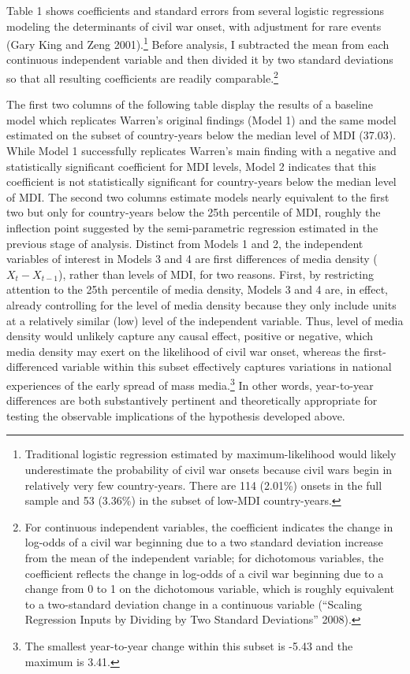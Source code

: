 \documentclass[11pt,article,oneside]{memoir}
\begin{document}
Table 1 shows coefficients and standard errors from several logistic
regressions modeling the determinants of civil war onset, with
adjustment for rare events (Gary King and Zeng 2001).\footnote{Traditional
  logistic regression estimated by maximum-likelihood would likely
  underestimate the probability of civil war onsets because civil wars
  begin in relatively very few country-years. There are 114 (2.01\%)
  onsets in the full sample and 53 (3.36\%) in the subset of low-MDI
  country-years.} Before analysis, I subtracted the mean from each
continuous independent variable and then divided it by two standard
deviations so that all resulting coefficients are readily
comparable.\footnote{For continuous independent variables, the
  coefficient indicates the change in log-odds of a civil war beginning
  due to a two standard deviation increase from the mean of the
  independent variable; for dichotomous variables, the coefficient
  reflects the change in log-odds of a civil war beginning due to a
  change from 0 to 1 on the dichotomous variable, which is roughly
  equivalent to a two-standard deviation change in a continuous variable
  (``Scaling Regression Inputs by Dividing by Two Standard Deviations''
  2008).}

The first two columns of the following table display the results of a
baseline model which replicates Warren's original findings (Model 1) and
the same model estimated on the subset of country-years below the median
level of MDI (37.03). While Model 1 successfully replicates Warren's
main finding with a negative and statistically significant coefficient
for MDI levels, Model 2 indicates that this coefficient is not
statistically significant for country-years below the median level of
MDI. The second two columns estimate models nearly equivalent to the
first two but only for country-years below the 25th percentile of MDI,
roughly the inflection point suggested by the semi-parametric regression
estimated in the previous stage of analysis. Distinct from Models 1 and
2, the independent variables of interest in Models 3 and 4 are first
differences of media density ($X_{t} - X_{t-1}$), rather than levels of
MDI, for two reasons. First, by restricting attention to the 25th
percentile of media density, Models 3 and 4 are, in effect, already
controlling for the level of media density because they only include
units at a relatively similar (low) level of the independent variable.
Thus, level of media density would unlikely capture any causal effect,
positive or negative, which media density may exert on the likelihood of
civil war onset, whereas the first-differenced variable within this
subset effectively captures variations in national experiences of the
early spread of mass media.\footnote{The smallest year-to-year change
  within this subset is -5.43 and the maximum is 3.41.} In other words,
year-to-year differences are both substantively pertinent and
theoretically appropriate for testing the observable implications of the
hypothesis developed above.
\end{document}
